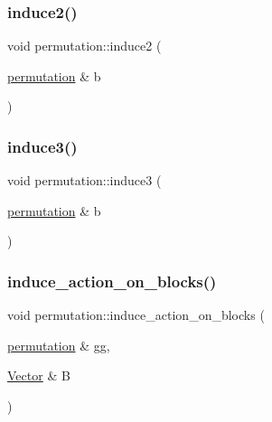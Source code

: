 \subsubsection{\texorpdfstring{induce2()}{induce2()}}
{\footnotesize\ttfamily void permutation\+::induce2 (\begin{DoxyParamCaption}\item[{\mbox{\hyperlink{classpermutation}{permutation}} \&}]{b }\end{DoxyParamCaption})}

\mbox{\label{classpermutation_a159dadce81dccf039f1a41825a0bb49e}} 
\subsubsection{\texorpdfstring{induce3()}{induce3()}}
{\footnotesize\ttfamily void permutation\+::induce3 (\begin{DoxyParamCaption}\item[{\mbox{\hyperlink{classpermutation}{permutation}} \&}]{b }\end{DoxyParamCaption})}

\mbox{\label{classpermutation_aa059d415966f85e6cf0753f20b80d4ab}} 
\subsubsection{\texorpdfstring{induce\+\_\+action\+\_\+on\+\_\+blocks()}{induce\_action\_on\_blocks()}}
{\footnotesize\ttfamily void permutation\+::induce\+\_\+action\+\_\+on\+\_\+blocks (\begin{DoxyParamCaption}\item[{\mbox{\hyperlink{classpermutation}{permutation}} \&}]{gg,  }\item[{\mbox{\hyperlink{class_vector}{Vector}} \&}]{B }\end{DoxyParamCaption})}

\mbox{\label{classpermutation_a55823b01d08ca0624a98d943da83245c}} 
